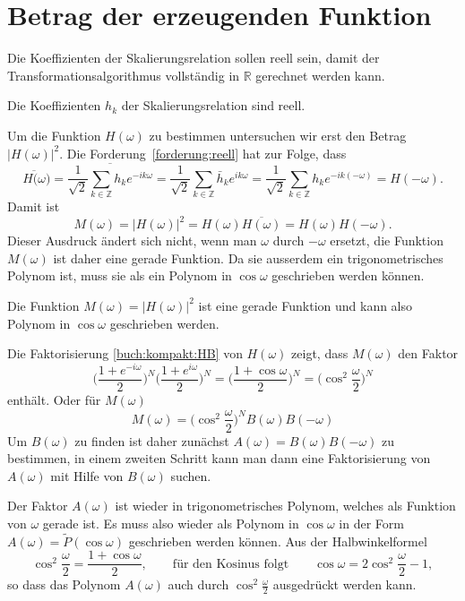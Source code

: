 %
%
%
\section{Betrag der erzeugenden Funktion\label{section:betrag}}
Die Koeffizienten der Skalierungsrelation sollen reell sein, damit
der Transformationsalgorithmus vollständig in $\mathbb R$ gerechnet
werden kann.

\begin{forderung}
\label{forderung:reell}
Die Koeffizienten $h_k$ der Skalierungsrelation sind reell.
\end{forderung}

Um die Funktion $H(\omega)$ zu bestimmen untersuchen wir erst den
Betrag $|H(\omega)|^2$.
Die Forderung~\ref{forderung:reell} hat zur Folge, dass
\[
\overline{H(\omega})
=
\overline{
\frac1{\sqrt{2}}
\sum_{k\in\mathbb Z} h_ke^{-ik\omega}
}
=
\frac1{\sqrt{2}}
\sum_{k\in\mathbb Z} \bar{h}_ke^{ik\omega}
=
\frac1{\sqrt{2}}
\sum_{k\in\mathbb Z} h_ke^{-ik(-\omega)}
=
H(-\omega).
\]
Damit ist
\[
M(\omega)
=
|H(\omega)|^2
=
H(\omega)
\overline{H(\omega)}
=
H(\omega)H(-\omega).
\]
Dieser Ausdruck ändert sich nicht, wenn man $\omega$ durch $-\omega$
ersetzt, die Funktion $M(\omega)$ ist daher eine gerade Funktion.
Da sie ausserdem ein trigonometrisches Polynom ist, muss sie
als ein Polynom in $\cos\omega$ geschrieben werden können.

\begin{konsequenz}
Die Funktion $M(\omega)=|H(\omega)|^2$ ist eine gerade Funktion
und kann also Polynom in $\cos\omega$ geschrieben werden.
\end{konsequenz}

Die Faktorisierung \eqref{buch:kompakt:HB} von $H(\omega)$
zeigt, dass $M(\omega)$ den Faktor
\[
\biggl(\frac{1+e^{-i\omega}}2\biggr)^N
\biggl(\frac{1+e^{i\omega}}2\biggr)^N
=
\biggl( \frac{1+\cos\omega}2\biggr)^N
=
\biggl(
\cos^2\frac{\omega}2
\biggr)^N
\]
enthält.
Oder für $M(\omega)$
\begin{equation}
M(\omega)
= 
\biggl(
\cos^2\frac{\omega}2
\biggr)^N
B(\omega)B(-\omega)
\label{buch:kompakt:MB}
\end{equation}
Um $B(\omega)$ zu finden ist daher zunächst
$A(\omega)=B(\omega)B(-\omega)$
zu bestimmen, in einem zweiten Schritt kann man dann eine
Faktorisierung von $A(\omega)$ mit Hilfe von $B(\omega)$ suchen.

Der Faktor $A(\omega)$ ist wieder in trigonometrisches Polynom,
welches als Funktion von $\omega$ gerade ist.
Es muss also wieder als Polynom in $\cos\omega$
in der Form $A(\omega)=\tilde{P}(\cos\omega)$
geschrieben werden können.
Aus der Halbwinkelformel
\[
\cos^2\frac{\omega}2
=
\frac{1+\cos\omega}2,
\qquad
\text{für den Kosinus folgt}
\qquad
\cos\omega
=
2\cos^2\frac{\omega}2 - 1,
\]
so dass das Polynom $A(\omega)$ auch durch $\cos^2\frac{\omega}2$
ausgedrückt werden kann.

